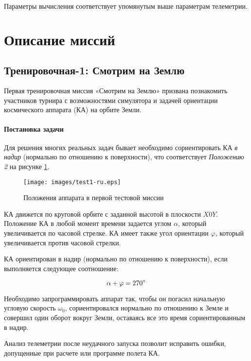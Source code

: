 \documentclass[12pt,a4paper]{article}
\begin{document}
Параметры вычисления соответствует упомянутым выше параметрам телеметрии.

\section{Описание миссий}
\label{Sec:Missions}

\subsection{Тренировочная-1: Смотрим на Землю}

Первая тренировочная миссия «Смотрим на Землю» призвана познакомить участников турнира с
возможностями симулятора и задачей ориентации космического аппарата (КА) на орбите Земли.

\paragraph{Постановка задачи} Для решения многих реальных задач бывает необходимо сориентировать КА \emph{в надир} (нормально
по отношению к поверхности), что соответствует \emph{Положению 2} на рисунке \ref{Pic:test1}.

\begin{figure}[tbh]
  \begin{center}
    \texttt{[image: images/test1-ru.eps]}
    \caption{Положения аппарата в первой тестовой миссии}
    \label{Pic:test1}
  \end{center}
\end{figure}

КА движется по круговой орбите с заданной высотой в плоскости $X0Y$. Положение КА в любой
момент времени задается углом $\alpha$, который увеличивается по часовой стрелке. КА имеет
также угол ориентации $\varphi$, который увеличивается против часовой стрелки.

КА ориентирован в надир (нормально по отношению к поверхности), если выполняется следующее
соотношение:

$$
\alpha + \varphi = 270 \degree
$$

Необходимо запрограммировать аппарат так, чтобы он погасил начальную угловую скорость $\omega_0$,
сориентировался нормально по отношению к Земле и совершил один оборот вокруг Земли,
оставаясь все это время сориентированным в надир.

Анализ телеметрии после неудачного запуска позволит исправить ошибки, допущенные при
расчете или программе полета КА.
\end{document}
